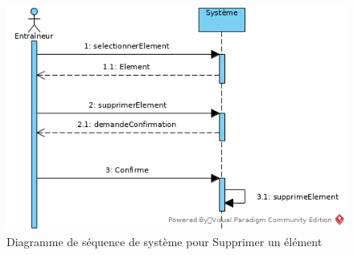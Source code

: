 \begin{figure}[htpb]
    \centering
    \includegraphics[scale=0.5]{fig/ssd_supprimer_element.png}
    \caption{Diagramme de s\'equence de syst\`eme pour Supprimer un él\'ement}
    \label{fig:ssd_supprimer_element}
\end{figure}
\newpage



